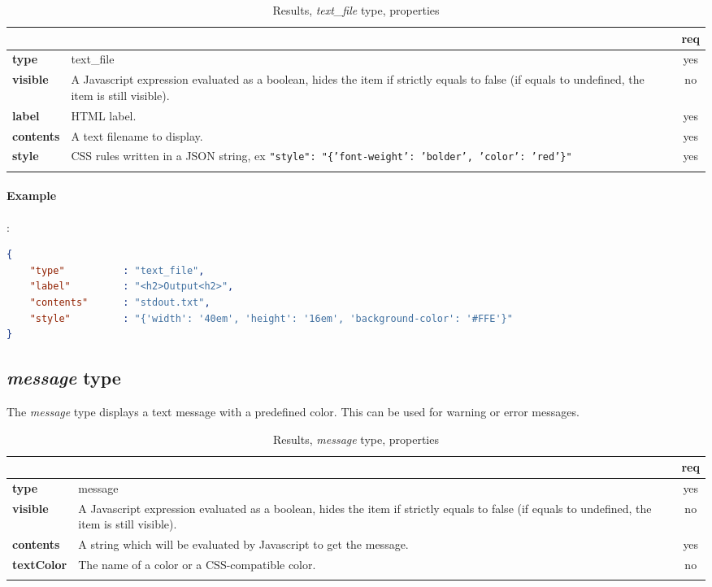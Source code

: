 \begin{longtable}{|>{\bf}L{\linewidth}|L{\linewidth}|c|}
\hline
{}     &  & {\bf req} \tabularnewline 
\hline \hline
 type      & text\_file  & yes \\ \hline
 visible    & A Javascript expression evaluated as a boolean, hides the item if
              strictly equals to false (if equals to undefined, the item is still visible). & no \\ \hline
 label     & HTML label. & yes \\ \hline
 contents  & A text filename to display. & yes \\ \hline
 style     & CSS rules written in a JSON string, ex 
             \texttt{"style": "\{'font-weight': 'bolder', 'color': 'red'\}"} & yes \\ \hline
\caption{Results, \emph{text\_file} type, properties}
\end{longtable}

\paragraph{Example}:\\
\begin{lstlisting}[language=json,firstnumber=1]
{ 
    "type"          : "text_file", 
    "label"         : "<h2>Output<h2>",
    "contents"      : "stdout.txt",
    "style"         : "{'width': '40em', 'height': '16em', 'background-color': '#FFE'}"
}
\end{lstlisting}


\subsection{ \emph{message} type}

The \emph{message} type displays a text message with a predefined color. This can be 
used for warning or error messages.

\begin{longtable}{|>{\bf}L{\linewidth}|L{\linewidth}|c|}
\hline
      &  & {\bf req} \tabularnewline 
\hline \hline
 type       & message  & yes \\ \hline
 visible    & A Javascript expression evaluated as a boolean, hides the item if
              strictly equals to false (if equals to undefined, the item is still visible). & no \\ \hline
 contents   & A string which will be evaluated by Javascript to get the message. & yes \\ \hline
 textColor  & The name of a color or a CSS-compatible color. & no \\ \hline
\caption{Results, \emph{message} type, properties}
\end{longtable}

